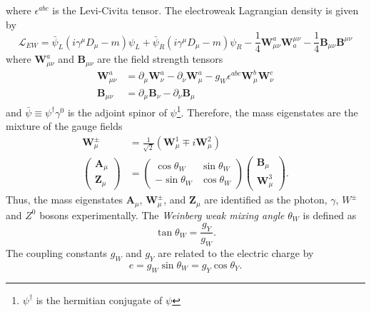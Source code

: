 %
where $\epsilon^{abc}$ is the Levi-Civita tensor.
The electroweak Lagrangian density is given by
%
\begin{equation}
    \mathcal{L}_{EW} = \bar{\psi}_{L} (i \gamma^{\mu} D_{\mu} - m) \psi_{L} + \bar{\psi}_{R} (i \gamma^{\mu} D_{\mu} - m) \psi_{R} - \frac{1}{4} \bm{W}_{\mu\nu}^{a} \bm{W}_{a}^{\mu\nu} - \frac{1}{4} \bm{B}_{\mu\nu} \bm{B}^{\mu\nu}
    \label{eq:sm_Lagrangian_ew}
\end{equation}
%
where $\bm{W}_{\mu\nu}^{a}$ and $\bm{B}_{\mu\nu}$ are the field strength tensors
%
\begin{align}
    \bm{W}_{\mu\nu}^{a} & = \partial_{\mu} \bm{W}_{\nu}^{a} - \partial_{\nu} \bm{W}_{\mu}^{a} - g_{W} \epsilon^{abc} \bm{W}_{\mu}^{b} \bm{W}_{\nu}^{c}\\
    \bm{B}_{\mu\nu} & = \partial_{\mu} \bm{B}_{\nu} - \partial_{\nu} \bm{B}_{\mu}
    \label{eq:sm_field_strangth_tensors}
\end{align}
%
and $\bar{\psi} \equiv \psi^{\dagger} \gamma^{0}$ is the adjoint spinor of $\psi$\footnote{$\psi^{\dagger}$ is the hermitian conjugate of $\psi$}.
Therefore, the mass eigenstates are the mixture of the gauge fields
%
\begin{align}
    \bm{W}_{\mu}^{\pm} & = \frac{1}{\sqrt{2}} (\bm{W}_{\mu}^{1} \mp i \bm{W}_{\mu}^{2})\\
    \left(\begin{matrix}\bm{A}_{\mu}\\\bm{Z}_{\mu}\end{matrix}\right) & = \left(\begin{matrix}\cos\theta_{W} & \sin\theta_{W}\\-\sin\theta_{W} & \cos\theta_{W} \end{matrix}\right) \left(\begin{matrix}\bm{B}_{\mu}\\\bm{W}_{\mu}^{3}\end{matrix}\right).
    \label{eq:sm_mass_eigenstates}
\end{align}
%
Thus, the mass eigenstates $\bm{A}_{\mu}$, $\bm{W}_{\mu}^{\pm}$, and $\bm{Z}_{\mu}$ are identified as the photon, $\gamma$, $W^{\pm}$ and $Z^{0}$ bosons experimentally.
The \textit{Weinberg weak mixing angle} $\theta_{W}$ is defined as
%
\begin{equation}
    \tan \theta_{W} = \frac{g_{Y}}{g_{W}}.
    \label{eq:sm_mixing_angle}
\end{equation}
%
The coupling constants $g_{W}$ and $g_{Y}$ are related to the electric charge by
%
\begin{equation}
    e = g_{W} \sin\theta_{W} = g_{Y} \cos\theta_{Y}.
    \label{eq:sm_coupling_constants}
\end{equation}
